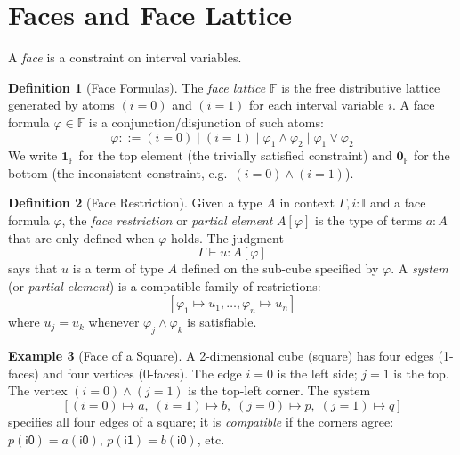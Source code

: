 \documentclass[11pt,a4paper]{report}
\theoremstyle{definition}
\newtheorem{definition}{Definition}[chapter]
\newtheorem{example}[definition]{Example}
\theoremstyle{plain}
\newcommand{\interval}{\mathbb{I}}
\begin{document}
\section{Faces and Face Lattice}

A \emph{face} is a constraint on interval variables.

\begin{definition}[Face Formulas]
\label{def:face-formulas}
The \emph{face lattice} $\mathbb{F}$ is the free distributive lattice
generated by atoms $(i = 0)$ and $(i = 1)$ for each interval variable $i$.
A face formula $\varphi \in \mathbb{F}$ is a conjunction/disjunction of
such atoms:
\[
  \varphi ::= (i = 0) \mid (i = 1) \mid \varphi_1 \land \varphi_2
  \mid \varphi_1 \lor \varphi_2
\]
We write $\mathbf{1}_\mathbb{F}$ for the top element (the trivially
satisfied constraint) and $\mathbf{0}_\mathbb{F}$ for the bottom
(the inconsistent constraint, e.g.\ $(i=0) \land (i=1)$).
\end{definition}

\begin{definition}[Face Restriction]
\label{def:face-restriction}
Given a type $A$ in context $\Gamma, i : \interval$ and a face
formula $\varphi$, the \emph{face restriction} or \emph{partial element}
$A[\varphi]$ is the type of terms $a : A$ that are only defined when
$\varphi$ holds.  The judgment
\[
  \Gamma \vdash u : A[\varphi]
\]
says that $u$ is a term of type $A$ defined on the sub-cube
specified by $\varphi$.  A \emph{system} (or \emph{partial element})
is a compatible family of restrictions:
\[
  [\varphi_1 \mapsto u_1, \ldots, \varphi_n \mapsto u_n]
\]
where $u_j = u_k$ whenever $\varphi_j \land \varphi_k$ is satisfiable.
\end{definition}

\begin{example}[Face of a Square]
A 2-dimensional cube (square) has four edges (1-faces) and four vertices
(0-faces).  The edge $i = 0$ is the left side; $j = 1$ is the top.
The vertex $(i = 0) \land (j = 1)$ is the top-left corner.  The system
\[
  [(i = 0) \mapsto a,\; (i = 1) \mapsto b,\; (j = 0) \mapsto p,\;
   (j = 1) \mapsto q]
\]
specifies all four edges of a square; it is \emph{compatible} if the
corners agree: $p(\mathsf{i0}) = a(\mathsf{i0})$,
$p(\mathsf{i1}) = b(\mathsf{i0})$, etc.
\end{example}
\end{document}

